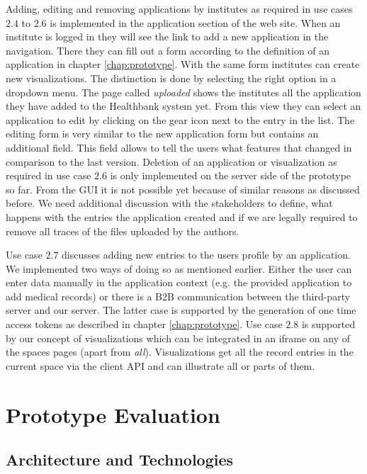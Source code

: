 Adding, editing and removing applications by institutes as required in use cases $2.4$ to $2.6$ is implemented in the application section of the web site. When an institute is logged in they will see the link to add a new application in the navigation. There they can fill out a form according to the definition of an application in chapter \ref{chap:prototype}. With the same form institutes can create new visualizations. The distinction is done by selecting the right option in a dropdown menu. The page called \emph{uploaded} shows the institutes all the application they have added to the Healthbank system yet. From this view they can select an application to edit by clicking on the gear icon next to the entry in the list. The editing form is very similar to the new application form but contains an additional field. This field allows to tell the users what features that changed in comparison to the last version. Deletion of an application or visualization as required in use case $2.6$ is only implemented on the server side of the prototype so far. From the GUI it is not possible yet because of similar reasons as discussed before. We need additional discussion with the stakeholders to define, what happens with the entries the application created and if we are legally required to remove all traces of the files uploaded by the authors. 

Use case $2.7$ discusses adding new entries to the users profile by an application. We implemented two ways of doing so as mentioned earlier. Either the user can enter data manually in the application context (e.g. the provided application to add medical records) or there is a B2B communication between the third-party server and our server. The latter case is supported by the generation of one time access tokens as described in chapter \ref{chap:prototype}. Use case $2.8$ is supported by our concept of visualizations which can be integrated in an iframe on any of the spaces pages (apart from \emph{all}). Visualizations get all the record entries in the current space via the client API and can illustrate all or parts of them. 


\section{Prototype Evaluation}

\subsection{Architecture and Technologies}

